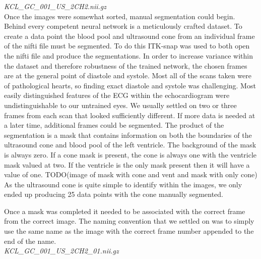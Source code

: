 \documentclass[12pt]{article}
\begin{document}
\textit{KCL\_GC\_001\_US\_2CH2.nii.gz}\\

Once the images were somewhat sorted, manual segmentation could begin. Behind every competent neural network is a meticulously crafted dataset.
To create a data point the blood pool and ultrasound cone from an individual frame of the nifti file must be segmented. To do this ITK-snap was used to both open the nifti file and produce the segmentations.
In order to increase variance within the dataset and therefore robustness of the trained network, the chosen frames are at the general point of diastole and systole.
Most all of the scans taken were of pathological hearts, so finding exact diastole and systole was challenging.
Most easily distinguished features of the ECG within the echocardiogram were undistinguishable to our untrained eyes.
We usually settled on two or three frames from each scan that looked sufficiently different.
If more data is needed at a later time, additional frames could be segmented.
The product of the segmentation is a mask that contains information on both the boundaries of the ultrasound cone and blood pool of the left ventricle.
The background of the mask is always zero. If a cone mask is present, the cone is always one with the ventricle mask valued at two.
If the ventricle is the only mask present then it will have a value of one.
TODO(image of mask with cone and vent and mask with only cone)
As the ultrasound cone is quite simple to identify within the images, we only ended up producing 25 data points with the cone manually segmented.
\par
Once a mask was completed it needed to be associated with the correct frame from the correct image.
The naming convention that we settled on was to simply use the same name as the image with the correct frame number appended to the end of the name.\\

\textit{KCL\_GC\_001\_US\_2CH2\_01.nii.gz}\\
\end{document}
